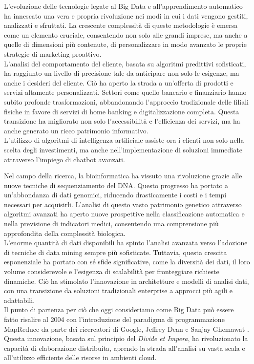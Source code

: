 L'evoluzione delle tecnologie legate al Big Data e all'apprendimento automatico ha innescato una vera e propria rivoluzione nei modi in cui i dati vengono gestiti, analizzati e sfruttati. 
La crescente complessità di queste metodologie è emersa come un elemento cruciale, consentendo non solo alle grandi imprese, ma anche a quelle di dimensioni più contenute, di personalizzare in modo avanzato le proprie strategie di marketing proattivo. \\
L'analisi del comportamento del cliente, basata su algoritmi predittivi sofisticati, ha raggiunto un livello di precisione tale da anticipare non solo le esigenze, ma anche i desideri del cliente.
Ciò ha aperto la strada a un'offerta di prodotti e servizi altamente personalizzati. 
Settori come quello bancario e finanziario hanno subito profonde trasformazioni, abbandonando l'approccio tradizionale delle filiali fisiche in favore di servizi di home banking e digitalizzazione completa.
Questa transizione ha migliorato non solo l'accessibilità e l'efficienza dei servizi, ma ha anche generato un ricco patrimonio informativo. \\
L'utilizzo di algoritmi di intelligenza artificiale assiste ora i clienti non solo nella scelta degli investimenti, ma anche nell'implementazione di soluzioni immediate attraverso l'impiego di chatbot avanzati.

Nel campo della ricerca, la bioinformatica ha vissuto una rivoluzione grazie alle nuove tecniche di sequenziamento del DNA. 
Questo progresso ha portato a un'abbondanza di dati genomici, riducendo drasticamente i costi e i tempi necessari per acquisirli. 
L'analisi di questo vasto patrimonio genetico attraverso algoritmi avanzati ha aperto nuove prospettive nella classificazione automatica e nella previsione di indicatori medici, consentendo una comprensione più approfondita della complessità biologica. \\
L'enorme quantità di dati disponibili ha spinto l'analisi avanzata verso l'adozione di tecniche di data mining sempre più sofisticate.
Tuttavia, questa crescita esponenziale ha portato con sé sfide significative, come la diversità dei dati, il loro volume considerevole e l'esigenza di scalabilità per fronteggiare richieste dinamiche. 
Ciò ha stimolato l'innovazione in architetture e modelli di analisi dati, con una transizione da soluzioni tradizionali enterprise a approcci più agili e adattabili. \\
Il punto di partenza per ciò che oggi consideriamo come Big Data può essere fatto risalire al 2004 con l'introduzione del paradigma di programmazione MapReduce da parte dei ricercatori di Google, Jeffrey Dean e Sanjay Ghemawat \cite{mapReduce}. 
Questa innovazione, basata sul principio del \textit{Divide et Impera}, ha rivoluzionato la capacità di elaborazione distribuita, aprendo la strada all'analisi su vasta scala e all'utilizzo efficiente delle risorse in ambienti cloud.

